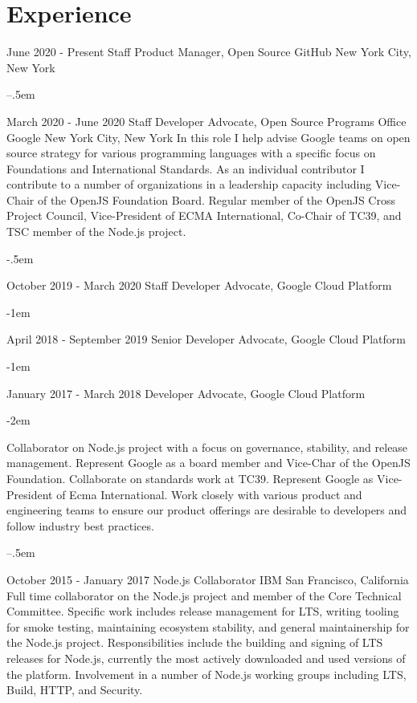 \documentclass[10pt,a4paper,sans]{moderncv}   %
\begin{document}
\makecvtitle

\section{Experience}

\cventry
  {June 2020 - Present}
  {Staff Product Manager, Open Source}
  {GitHub}
  {New York City, New York}{}
  {}
  
\kern--.5em

\cventry
  {March 2020 - June 2020}
  {Staff Developer Advocate, Open Source Programs Office}
  {Google}
  {New York City, New York}{}
  {In this role I help advise Google teams on open source strategy for various programming languages with a specific focus on Foundations and International Standards. As an individual contributor I contribute to a number of organizations in a leadership capacity including Vice-Chair of the OpenJS Foundation Board. Regular member of the OpenJS Cross Project Council, Vice-President of ECMA International, Co-Chair of TC39, and TSC member of the Node.js project.}

\kern-.5em

\cventry
  {October 2019 - March 2020}
  {Staff Developer Advocate, Google Cloud Platform}
  {}
  {}{}
  {}

\kern-1em

\cventry
  {April 2018 - September 2019}
  {Senior Developer Advocate, Google Cloud Platform}
  {}
  {}{}
  {}

\kern-1em

\cventry
  {January 2017 - March 2018}
  {Developer Advocate, Google Cloud Platform}
  {}
  {}{}
  {}

\kern-2em

\cventry
  {}
  {}
  {}
  {}{}
  {Collaborator on Node.js project with a focus on governance, stability, and release management. Represent Google as a board member and Vice-Char of the OpenJS Foundation. Collaborate on standards work at TC39. Represent Google as Vice-President of Ecma International. Work closely with various product and engineering teams to ensure our product offerings are desirable to developers and follow industry best practices.}

\kern--.5em

\cventry
  {October 2015 - January 2017}
  {Node.js Collaborator}
  {IBM}
  {San Francisco, California}{}
  {Full time collaborator on the Node.js project and member of the Core Technical Committee. Specific work includes release management for LTS, writing tooling for smoke testing, maintaining ecosystem stability, and general maintainership for the Node.js project.  Responsibilities include the building and signing of LTS releases for Node.js, currently the most actively downloaded and used versions of the platform. Involvement in a number of Node.js working groups including LTS, Build, HTTP, and Security.  }
\end{document}
